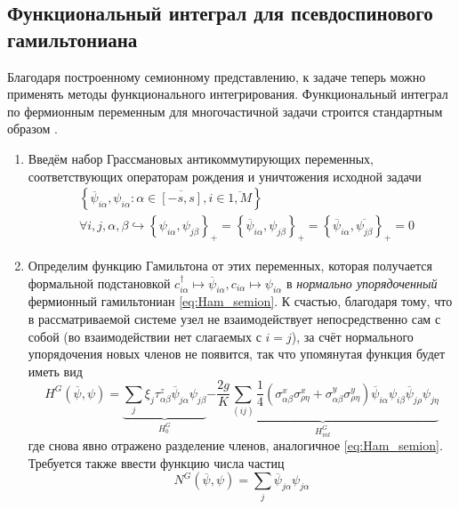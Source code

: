 \subsection{Функциональный интеграл для псевдоспинового гамильтониана}
Благодаря построенному семионному представлению, к задаче теперь можно применять методы функционального интегрирования. Функциональный интеграл по фермионным переменным для многочастичной задачи строится стандартным образом \cite{Altland_Simons}.
\begin{enumerate}
	\item Введём набор Грассмановых антикоммутирующих переменных, соответствующих операторам рождения и уничтожения исходной задачи
	\begin{equation}
		\label{eq:Grassman_field_def}
		\begin{split}
			& \left\{ \overline{\psi}_{i\alpha}, \psi_{i\alpha}: \alpha \in \overline{[-s,s]}, i \in \overline{1,M}\right\} \\
			& \forall i,j,\alpha,\beta \hookrightarrow
			\left\{  \psi_{i\alpha}, \psi_{j\beta} \right\} _{+} = 
			\left\{  \overline{\psi}_{i\alpha}, \psi_{j\beta}  \right\} _{+} = 
			\left\{  \overline{\psi}_{i\alpha}, \overline{ \psi_{j\beta} } \right\} _{+} = 0
		\end{split}
	\end{equation}
	
	\item Определим функцию Гамильтона от этих переменных, которая получается формальной подстановкой $c^\dagger_{i\alpha} \mapsto \overline{\psi}_{i\alpha}, c_{i\alpha} \mapsto \psi_{i\alpha}$ в \textit{нормально упорядоченный} фермионный гамильтониан \eqref{eq:Ham_semion}. К счастью, благодаря тому, что в рассматриваемой системе узел не взаимодействует непосредственно сам с собой (во взаимодействии нет слагаемых с $i = j$), за счёт нормального упорядочения новых членов не появится, так что упомянутая функция будет иметь вид
	\begin{equation}
		\label{eq:Ham_grassman}
		H^G\left( \overline{\psi}, \psi \right) = \underset{H_0^G}{\underbrace{ \sum_{j} \xi_j \tau^z_{\alpha \beta} \overline{\psi}_{j\alpha} \psi_{j\beta} }} \underset{H_{int}^G}{\underbrace{ - \frac{2g}{K} \sum_{(ij)} \frac{1}{4}(\sigma^x_{\alpha \beta} \sigma^x_{\rho \eta} + \sigma^y_{\alpha \beta} \sigma^y_{\rho \eta}) \overline{\psi}_{i\alpha} \psi_{i\beta} \overline{\psi}_{j\rho} \psi_{j\eta} }}
	\end{equation}
	где снова явно отражено разделение членов, аналогичное \eqref{eq:Ham_semion}.
	Требуется также ввести функцию числа частиц
	\begin{equation}
		\label{eq:N_grassman}
		N^{G}\left( \overline{\psi}, \psi \right) = \sum_{j} \overline{\psi}_{j\alpha} \psi_{j\alpha}
	\end{equation}
	

\end{enumerate}
